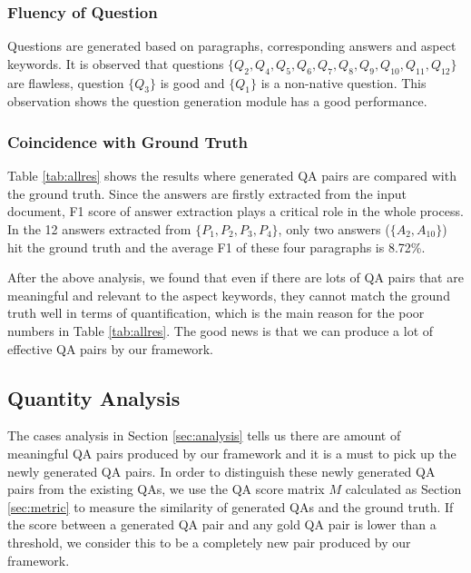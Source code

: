 \subsubsection{Fluency of Question} 
Questions are generated based on paragraphs, corresponding answers and  aspect keywords.
It is observed that questions $\{Q_2, Q_4, Q_5, Q_6, Q_7, Q_8, Q_9, Q_{10}, Q_{11}, Q_{12}\}$ are flawless, question $\{Q_3\}$ is good and $\{Q_1\}$ is a non-native question.
This observation shows the question generation module has a good performance.

\subsubsection{Coincidence with Ground Truth}
Table \ref{tab:allres} shows the results where generated QA pairs are compared with the ground truth.
Since the answers are firstly extracted from the input document, F1 score of answer extraction plays a critical role in the whole process.
In the 12 answers extracted from $\{P_1, P_2, P_3, P_4\}$, only two answers ($\{A_2, A_{10}\}$) hit the ground truth and the average F1 of these four paragraphs is 8.72\%.

After the above analysis, we found that even if there are lots of QA pairs that are meaningful and relevant to the aspect keywords, they cannot match the ground truth well in terms of quantification, which is the main reason for the poor numbers in Table \ref{tab:allres}.
The good news is that we can produce a lot of effective QA pairs by our framework.


\subsection{Quantity Analysis}
The cases analysis in Section \ref{sec:analysis} tells us there are amount of meaningful QA pairs produced by our framework and it is a must to pick up the newly generated QA pairs.
In order to distinguish these newly generated QA pairs from the existing QAs, we use the QA score matrix $M$ calculated as Section \ref{sec:metric} to measure the similarity of generated QAs and the ground truth.
If the score between a generated QA pair and any gold QA pair is lower than a threshold, we consider this to be a completely new pair produced by our framework.

